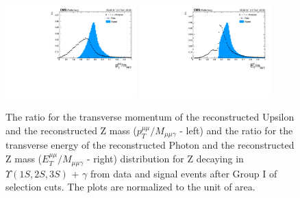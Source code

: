 \begin{figure}[!htbp]
\begin{center}
\includegraphics[width=0.45\textwidth]{figures_and_tables/outputPlots/ZtoUpsilon_Cat0_ZZZZZ/au/data_x_mc/noKinCuts/h_noKin_upsilonPt_over_zMass}\hspace*{1.cm}
\includegraphics[width=0.45\textwidth]{figures_and_tables/outputPlots/ZtoUpsilon_Cat0_ZZZZZ/au/data_x_mc/noKinCuts/h_noKin_photonPt_over_zMass}
\end{center}\vspace*{-.5cm}
\caption{The ratio for the transverse momentum of the reconstructed Upsilon and the reconstructed Z mass ($p_{T}^{\mu\mu}/M_{\mu\mu\gamma}$ - left) and the ratio for the transverse energy of the reconstructed Photon and the reconstructed Z mass ($E_{T}^{\mu\mu}/M_{\mu\mu\gamma}$ - right) distribution for Z decaying in $\Upsilon(1S,2S,3S)$ + $\gamma$ from data and signal events after Group I of selection cuts. The plots are normalized to the unit of area.}
\label{fig:energy_ration_ZtoUpsilon_Cat0}
\end{figure}

